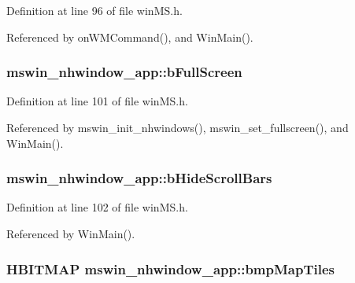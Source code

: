 Definition at line 96 of file win\+M\+S.\+h.



Referenced by on\+W\+M\+Command(), and Win\+Main().

\hypertarget{structmswin__nhwindow__app_a03ec520343918e83b3b20c9c08ee9d57}{
\subsubsection[{b\+Full\+Screen}]{ mswin\+\_\+nhwindow\+\_\+app\+::b\+Full\+Screen}}\label{structmswin__nhwindow__app_a03ec520343918e83b3b20c9c08ee9d57}


Definition at line 101 of file win\+M\+S.\+h.



Referenced by mswin\+\_\+init\+\_\+nhwindows(), mswin\+\_\+set\+\_\+fullscreen(), and Win\+Main().

\hypertarget{structmswin__nhwindow__app_a9bf5a4ea1b1d3680e30d893f16117a8f}{
\subsubsection[{b\+Hide\+Scroll\+Bars}]{ mswin\+\_\+nhwindow\+\_\+app\+::b\+Hide\+Scroll\+Bars}}\label{structmswin__nhwindow__app_a9bf5a4ea1b1d3680e30d893f16117a8f}


Definition at line 102 of file win\+M\+S.\+h.



Referenced by Win\+Main().

\hypertarget{structmswin__nhwindow__app_a61984761ecf8b4bbc83b25fdddddc8e7}{
\subsubsection[{bmp\+Map\+Tiles}]{\setlength{\rightskip}{0pt plus 5cm}H\+B\+I\+T\+M\+A\+P mswin\+\_\+nhwindow\+\_\+app\+::bmp\+Map\+Tiles}}\label{structmswin__nhwindow__app_a61984761ecf8b4bbc83b25fdddddc8e7}


